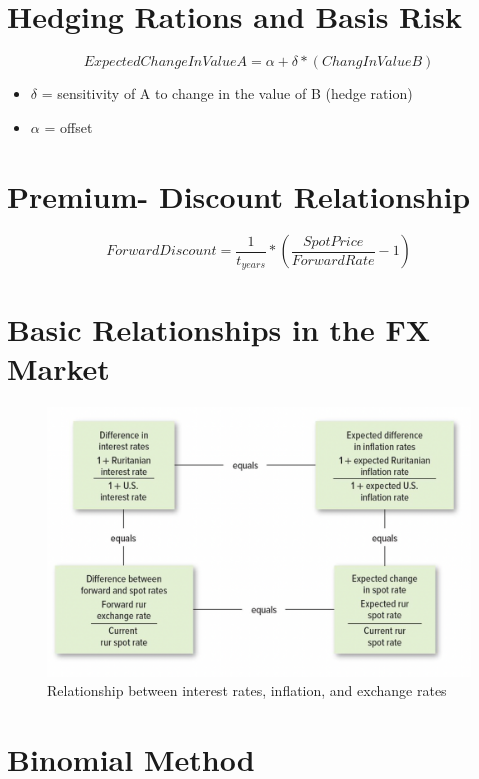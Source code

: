 \documentclass{cheatsheet}
\begin{document}
\section*{Hedging Rations and Basis Risk}
\[ExpectedChangeInValueA = \alpha + \delta * (ChangInValueB)\]
\begin{itemize}
  \item $\delta$ = sensitivity of A to change in the value of B (hedge ration)
  \item $\alpha$ = offset
\end{itemize}
\section*{Premium- Discount Relationship}
\[ForwardDiscount = \frac{1}{t_{years}} * (\frac{SpotPrice}{ForwardRate} - 1)\]
\section{Basic Relationships
in the FX Market}
\begin{figure}[h!]
    \centering
    \includegraphics[width=0.2\linewidth]{Bildschirmfoto 2025-05-23 um 10.16.13.png}
    \caption{Relationship between interest rates, inflation, and exchange rates}
    \label{fig:interest_inflation_exchange}
\end{figure}
\section*{Binomial Method}
\end{document}
